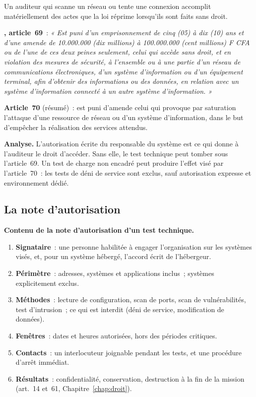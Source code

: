 Un auditeur qui scanne un réseau ou tente une connexion accomplit
matériellement des actes que la loi réprime lorsqu'ils sont faits sans
droit.

\begin{boxjuris}
\textbf{, article~69}~: \textit{« Est puni d'un
emprisonnement de cinq (05) à dix (10) ans et d'une amende de 10.000.000
(dix millions) à 100.000.000 (cent millions) F CFA ou de l'une de ces deux
peines seulement, celui qui accède sans droit, et en violation des mesures
de sécurité, à l'ensemble ou à une partie d'un réseau de communications
électroniques, d'un système d'information ou d'un équipement terminal,
afin d'obtenir des informations ou des données, en relation avec un
système d'information connecté à un autre système d'information. »}

\medskip
\textbf{Article~70} (résumé)~: est puni d'amende celui qui provoque par
saturation l'attaque d'une ressource de réseau ou d'un système
d'information, dans le but d'empêcher la réalisation des services
attendus.

\medskip
\textbf{Analyse.} L'autorisation écrite du responsable du système est ce
qui donne à l'auditeur le droit d'accéder. Sans elle, le test technique
peut tomber sous l'article~69. Un test de charge non encadré peut
produire l'effet visé par l'article~70~: les tests de déni de service
sont exclus, sauf autorisation expresse et environnement dédié.
\end{boxjuris}

\subsection{La note d'autorisation}

\begin{boxprocedure}
\textbf{Contenu de la note d'autorisation d'un test technique.}
\begin{enumerate}
    \item \textbf{Signataire}~: une personne habilitée à engager
          l'organisation sur les systèmes visés, et, pour un système
          hébergé, l'accord écrit de l'hébergeur.
    \item \textbf{Périmètre}~: adresses, systèmes et applications inclus~;
          systèmes explicitement exclus.
    \item \textbf{Méthodes}~: lecture de configuration, scan de ports, scan
          de vulnérabilités, test d'intrusion~; ce qui est interdit (déni
          de service, modification de données).
    \item \textbf{Fenêtres}~: dates et heures autorisées, hors des périodes
          critiques.
    \item \textbf{Contacts}~: un interlocuteur joignable pendant les tests,
          et une procédure d'arrêt immédiat.
    \item \textbf{Résultats}~: confidentialité, conservation, destruction
          à la fin de la mission (art.~14 et~61, Chapitre~\ref{chap:droit}).
\end{enumerate}
\end{boxprocedure}

